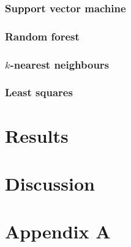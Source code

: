 \documentclass[twoside]{article}
\begin{document}
\begin{multicols}{2}
\subsubsection{Support vector machine}

\subsubsection{Random forest}

\subsubsection{$k$-nearest neighbours}

\subsubsection{Least squares}



\section{Results}



\section{Discussion}




{}


\section*{Appendix A}


\end{multicols}
\end{document}
